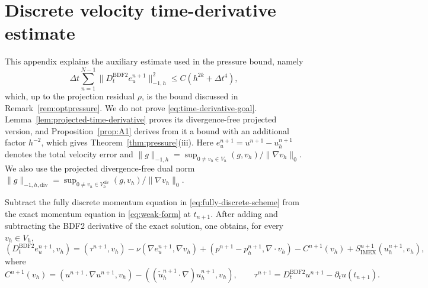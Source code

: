 \documentclass[11pt]{article}
\theoremstyle{remark}\newtheorem{remark}{Remark}
\newcommand{\Vh}{V_h}\newcommand{\Qh}{Q_h}
\newcommand{\Vdivh}{V_h^{\mathrm{div}}}
\newcommand{\Dt}{D_t^{\mathrm{BDF2}}}
\newcommand{\tu}{\tilde u_h}
\newcommand{\Simex}{S_{\mathrm{IMEX}}}
\theoremstyle{plain}
\newcommand{\new}[1]{{\color{blue}#1}}
\begin{document}
\section{Discrete velocity time-derivative estimate}
This appendix explains the auxiliary estimate used in the pressure bound, namely
\begin{equation}\label{eq:time-derivative-goal}
\Delta t\sum_{n=1}^{N-1}\|\Dt e_u^{n+1}\|_{-1,h}^2\le C(h^{2k}+\Delta t^4),
\end{equation}
\new{which, up to the projection residual $\rho$, is the bound discussed in Remark~\ref{rem:optpressure}.} We do not prove \eqref{eq:time-derivative-goal}. Lemma~\ref{lem:projected-time-derivative} proves its divergence-free projected version, and Proposition~\ref{prop:A1} derives from it a bound with an additional factor $h^{-2}$, which gives \new{Theorem~\ref{thm:pressure}(iii)}. Here $e_u^{n+1}=u^{n+1}-u_h^{n+1}$ denotes the total velocity error and $\|g\|_{-1,h}=\sup_{0\ne v_h\in\Vh}(g,v_h)/\|\nabla v_h\|_0$. We also use the projected divergence-free dual norm $\|g\|_{-1,h,\mathrm{div}}=\sup_{0\ne v_h\in\Vdivh}(g,v_h)/\|\nabla v_h\|_0$.

Subtract the fully discrete momentum equation in \eqref{eq:fully-discrete-scheme} from the exact momentum equation in \eqref{eq:weak-form} at $t_{n+1}$. After adding and subtracting the BDF2 derivative of the exact solution, one obtains, for every $v_h\in\Vh$,
\begin{equation}\label{eq:time-derivative-error-identity}
(\Dt e_u^{n+1},v_h)=(\tau^{n+1},v_h)-\nu(\nabla e_u^{n+1},\nabla v_h)+(p^{n+1}-p_h^{n+1},\nabla\cdot v_h)-C^{n+1}(v_h)+\Simex^{n+1}(u_h^{n+1},v_h),
\end{equation}
where
\[
C^{n+1}(v_h)=(u^{n+1}\cdot\nabla u^{n+1},v_h)-((\tu^{n+1}\cdot\nabla)u_h^{n+1},v_h),\qquad
\tau^{n+1}=\Dt u^{n+1}-\partial_tu(t_{n+1}).
\]
\end{document}

